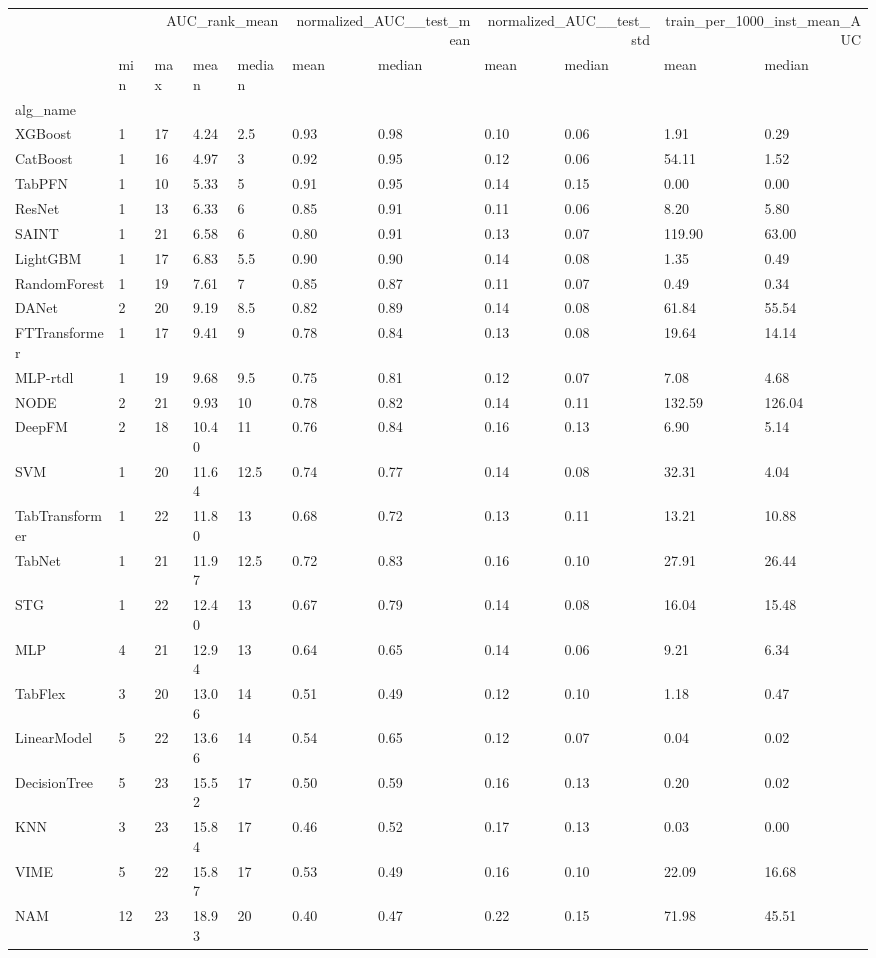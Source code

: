 \begin{tabular}{lllllllllll}
\toprule
 & \multicolumn{4}{r}{AUC_rank_mean} & \multicolumn{2}{r}{normalized_AUC__test_mean} & \multicolumn{2}{r}{normalized_AUC__test_std} & \multicolumn{2}{r}{train_per_1000_inst_mean_AUC} \\
 & min & max & mean & median & mean & median & mean & median & mean & median \\
alg_name &  &  &  &  &  &  &  &  &  &  \\
\midrule
XGBoost & 1 & 17 & 4.24 & 2.5 & 0.93 & 0.98 & 0.10 & 0.06 & 1.91 & 0.29 \\
CatBoost & 1 & 16 & 4.97 & 3 & 0.92 & 0.95 & 0.12 & 0.06 & 54.11 & 1.52 \\
TabPFN & 1 & 10 & 5.33 & 5 & 0.91 & 0.95 & 0.14 & 0.15 & 0.00 & 0.00 \\
ResNet & 1 & 13 & 6.33 & 6 & 0.85 & 0.91 & 0.11 & 0.06 & 8.20 & 5.80 \\
SAINT & 1 & 21 & 6.58 & 6 & 0.80 & 0.91 & 0.13 & 0.07 & 119.90 & 63.00 \\
LightGBM & 1 & 17 & 6.83 & 5.5 & 0.90 & 0.90 & 0.14 & 0.08 & 1.35 & 0.49 \\
RandomForest & 1 & 19 & 7.61 & 7 & 0.85 & 0.87 & 0.11 & 0.07 & 0.49 & 0.34 \\
DANet & 2 & 20 & 9.19 & 8.5 & 0.82 & 0.89 & 0.14 & 0.08 & 61.84 & 55.54 \\
FTTransformer & 1 & 17 & 9.41 & 9 & 0.78 & 0.84 & 0.13 & 0.08 & 19.64 & 14.14 \\
MLP-rtdl & 1 & 19 & 9.68 & 9.5 & 0.75 & 0.81 & 0.12 & 0.07 & 7.08 & 4.68 \\
NODE & 2 & 21 & 9.93 & 10 & 0.78 & 0.82 & 0.14 & 0.11 & 132.59 & 126.04 \\
DeepFM & 2 & 18 & 10.40 & 11 & 0.76 & 0.84 & 0.16 & 0.13 & 6.90 & 5.14 \\
SVM & 1 & 20 & 11.64 & 12.5 & 0.74 & 0.77 & 0.14 & 0.08 & 32.31 & 4.04 \\
TabTransformer & 1 & 22 & 11.80 & 13 & 0.68 & 0.72 & 0.13 & 0.11 & 13.21 & 10.88 \\
TabNet & 1 & 21 & 11.97 & 12.5 & 0.72 & 0.83 & 0.16 & 0.10 & 27.91 & 26.44 \\
STG & 1 & 22 & 12.40 & 13 & 0.67 & 0.79 & 0.14 & 0.08 & 16.04 & 15.48 \\
MLP & 4 & 21 & 12.94 & 13 & 0.64 & 0.65 & 0.14 & 0.06 & 9.21 & 6.34 \\
TabFlex & 3 & 20 & 13.06 & 14 & 0.51 & 0.49 & 0.12 & 0.10 & 1.18 & 0.47 \\
LinearModel & 5 & 22 & 13.66 & 14 & 0.54 & 0.65 & 0.12 & 0.07 & 0.04 & 0.02 \\
DecisionTree & 5 & 23 & 15.52 & 17 & 0.50 & 0.59 & 0.16 & 0.13 & 0.20 & 0.02 \\
KNN & 3 & 23 & 15.84 & 17 & 0.46 & 0.52 & 0.17 & 0.13 & 0.03 & 0.00 \\
VIME & 5 & 22 & 15.87 & 17 & 0.53 & 0.49 & 0.16 & 0.10 & 22.09 & 16.68 \\
NAM & 12 & 23 & 18.93 & 20 & 0.40 & 0.47 & 0.22 & 0.15 & 71.98 & 45.51 \\
\bottomrule
\end{tabular}
